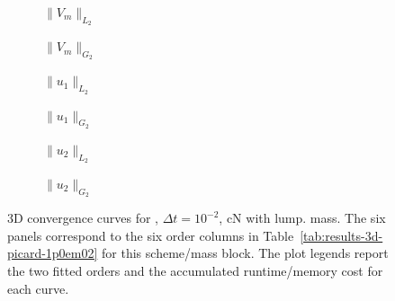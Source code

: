 \begin{figure}[p]
\centering
\begin{subfigure}{0.485\linewidth}
\centering
{}
\caption{$\|V_m\|_{L_2}$}
\label{fig:results-3d-picard-1p0em02-cranknicolson-lumped-a}
\end{subfigure}
\hfill
\begin{subfigure}{0.485\linewidth}
\centering
{}
\caption{$\|V_m\|_{G_2}$}
\label{fig:results-3d-picard-1p0em02-cranknicolson-lumped-b}
\end{subfigure}
\par\vspace{0.8em}
\begin{subfigure}{0.485\linewidth}
\centering
{}
\caption{$\|u_1\|_{L_2}$}
\label{fig:results-3d-picard-1p0em02-cranknicolson-lumped-c}
\end{subfigure}
\hfill
\begin{subfigure}{0.485\linewidth}
\centering
{}
\caption{$\|u_1\|_{G_2}$}
\label{fig:results-3d-picard-1p0em02-cranknicolson-lumped-d}
\end{subfigure}
\par\vspace{0.8em}
\begin{subfigure}{0.485\linewidth}
\centering
{}
\caption{$\|u_2\|_{L_2}$}
\label{fig:results-3d-picard-1p0em02-cranknicolson-lumped-e}
\end{subfigure}
\hfill
\begin{subfigure}{0.485\linewidth}
\centering
{}
\caption{$\|u_2\|_{G_2}$}
\label{fig:results-3d-picard-1p0em02-cranknicolson-lumped-f}
\end{subfigure}
\caption{3D convergence curves for , $\Delta t=10^{-2}$, cN with lump. mass. The six panels correspond to the six order columns in Table~\ref{tab:results-3d-picard-1p0em02} for this scheme/mass block. The plot legends report the two fitted orders and the accumulated runtime/memory cost for each curve.}
\label{fig:results-3d-picard-1p0em02-cranknicolson-lumped}
\end{figure}
\FloatBarrier

